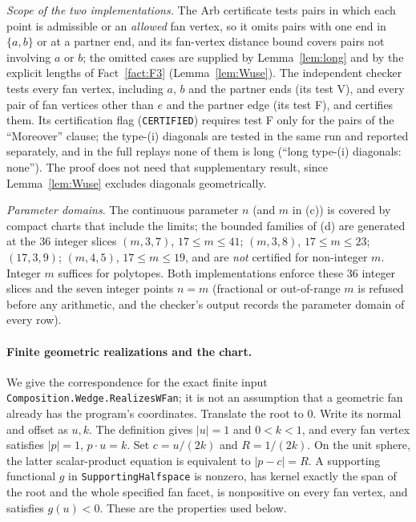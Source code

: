 \documentclass[11pt]{article}
\theoremstyle{definition}
\theoremstyle{remark}
\begin{document}
\noindent\emph{Scope of the two implementations.} The Arb
certificate tests pairs in which each point is admissible or an
\emph{allowed} fan vertex, so it omits pairs with one end in
$\{a,b\}$ or at a partner end, and its fan-vertex distance bound covers
pairs not involving $a$ or $b$; the omitted cases are supplied by
Lemma~\ref{lem:long} and by the explicit lengths of Fact~\ref{fact:F3}
(Lemma~\ref{lem:Wuse}). The independent checker tests every fan vertex,
including $a$, $b$ and the partner ends (its test V), and every pair of fan
vertices other than $e$ and the partner edge (its test F), and certifies
them. Its certification flag (\texttt{CERTIFIED}) requires test F only for the
pairs of the ``Moreover'' clause; the type-(i) diagonals are tested in the
same run and reported separately, and in the full replays none of them is
long (``long type-(i) diagonals: none''). The proof does not need that
supplementary result, since Lemma~\ref{lem:Wuse} excludes diagonals
geometrically.

\noindent\emph{Parameter domains}.
The continuous parameter $n$ (and $m$ in (c)) is covered by compact charts
that include the limits; the bounded families of (d) are generated at the
36 integer slices $(m,3,7)$, $17\le m\le41$; $(m,3,8)$, $17\le m\le23$;
$(17,3,9)$; $(m,4,5)$, $17\le m\le19$, and are \emph{not} certified for
non-integer $m$. Integer $m$ suffices for polytopes. Both
implementations enforce these 36 integer slices and the seven integer
points $n=m$ (fractional or out-of-range $m$ is refused before any
arithmetic, and the checker's output records the parameter domain of every
row).

\paragraph{Finite geometric realizations and the chart.}
We give the correspondence for the exact finite input
\texttt{Composition.Wedge.RealizesWFan}; it is not an assumption that a
geometric fan already has the program's coordinates. Translate the root
to $0$. Write its normal and offset as $u,k$. The definition gives
$|u|=1$ and $0<k<1$, and every fan vertex satisfies
$|p|=1$, $p\cdot u=k$. Set $c=u/(2k)$ and $R=1/(2k)$.
On the unit sphere, the latter scalar-product equation is equivalent to
$|p-c|=R$. A supporting functional $g$ in
\texttt{SupportingHalfspace} is nonzero, has kernel exactly the span of
the root and the whole specified fan facet, is nonpositive on every fan
vertex, and satisfies $g(u)<0$. These are the properties used below.
\end{document}
